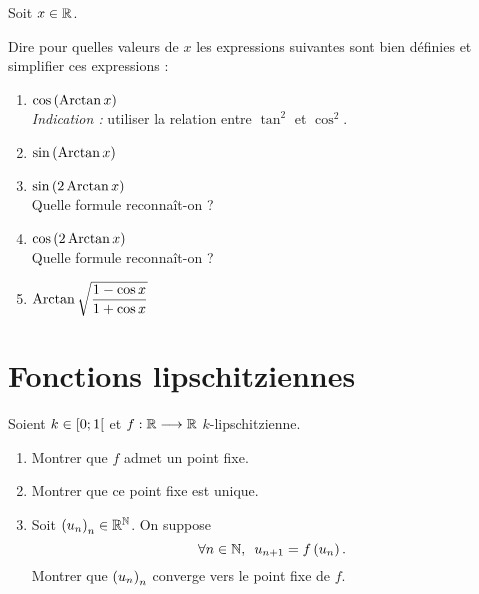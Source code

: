\begin{exo}[Exercice 21]
Soit \(x\in\mathbb{R}\).

Dire pour quelles valeurs de \(x\) les expressions suivantes sont bien définies et simplifier ces expressions :

\begin{enumerate}
\item \(\cos\left(\operatorname{Arctan} x\right)\) \\

\textit{Indication :} utiliser la relation entre \(\tan^2\) et \(\cos^2\). \\

\item \(\sin\left(\operatorname{Arctan} x\right)\) \\

\item \(\sin\left(2\operatorname{Arctan} x\right)\) \\

Quelle formule reconnaît-on ? \\

\item \(\cos\left(2\operatorname{Arctan} x\right)\) \\

Quelle formule reconnaît-on ? \\

\item \(\operatorname{Arctan}\sqrt{\dfrac{1-\cos x}{1+\cos x}}\)
\end{enumerate}
\end{exo}

\begin{corr}
\end{corr}

\section{Fonctions lipschitziennes}

\begin{exo}[Exercice 22]
Soient \(k\in\left[0;1\right[\) et \(f:\mathbb{R}\longrightarrow\mathbb{R}\) \(k\)-lipschitzienne.

\begin{enumerate}
\item Montrer que \(f\) admet un point fixe. \\

\item Montrer que ce point fixe est unique. \\

\item Soit \(\left(u_n\right)_n\in\mathbb{R}^{\mathbb{N}}\). On suppose \[\quantifs{\forall n\in\N}u_{n+1}=f\paren{u_n}.\] Montrer que \(\left(u_n\right)_n\) converge vers le point fixe de \(f\).
\end{enumerate}
\end{exo}


